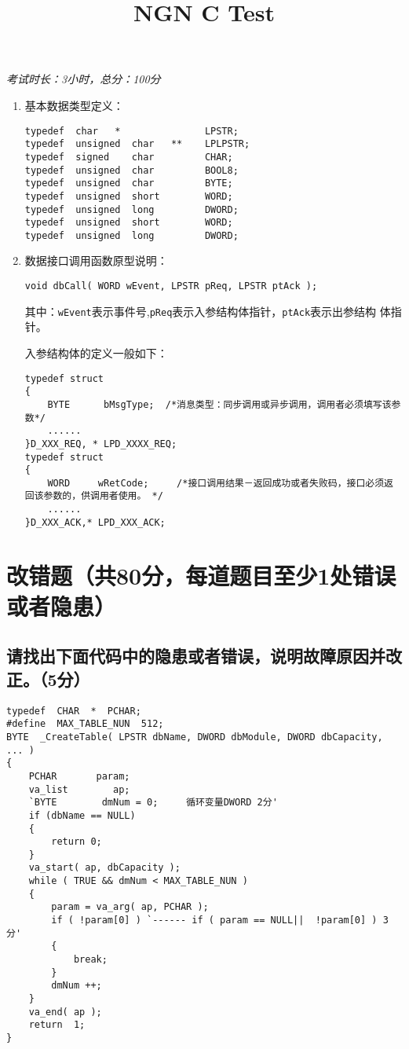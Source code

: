 ﻿\documentclass  [11pt,onecolumn,a4paper]{article}
\title{NGN C Test}
\author{}
\date{}
\begin{document}
\begin{center}
\begin{minipage}{0.8\linewidth}
\end{minipage}
\end{center}

\begin{flushright}
{\small{\textit{考试时长：3小时，总分：100分}}}
\end{flushright}

\normalsize{}

\begin{enumerate}
    \item 基本数据类型定义：
\begin{lstlisting}
typedef  char   *               LPSTR;
typedef  unsigned  char   **    LPLPSTR;
typedef  signed    char         CHAR;
typedef  unsigned  char         BOOL8;
typedef  unsigned  char         BYTE;
typedef  unsigned  short        WORD;
typedef  unsigned  long         DWORD;
typedef  unsigned  short        WORD;
typedef  unsigned  long         DWORD;
\end{lstlisting}
    \item 数据接口调用函数原型说明：
\begin{lstlisting}
void dbCall( WORD wEvent, LPSTR pReq, LPSTR ptAck );
\end{lstlisting}
其中：\lstinline{wEvent}表示事件号,\lstinline{pReq}表示入参结构体指针，\lstinline{ptAck}表示出参结构
体指针。

入参结构体的定义一般如下：
\begin{lstlisting}
typedef struct 
{
    BYTE      bMsgType;  /*消息类型：同步调用或异步调用，调用者必须填写该参数*/
    ......
}D_XXX_REQ, * LPD_XXXX_REQ;
typedef struct
{
    WORD     wRetCode;     /*接口调用结果－返回成功或者失败码，接口必须返回该参数的，供调用者使用。 */
    ......
}D_XXX_ACK,* LPD_XXX_ACK;
\end{lstlisting}
\end{enumerate}

\section{改错题（共80分，每道题目至少1处错误或者隐患）}
\subsection{请找出下面代码中的隐患或者错误，说明故障原因并改正。（5分）}
\begin{lstlisting}[escapeinside=`']
typedef  CHAR  *  PCHAR;  
#define  MAX_TABLE_NUN  512;
BYTE  _CreateTable( LPSTR dbName, DWORD dbModule, DWORD dbCapacity, ... )
{
    PCHAR       param;
    va_list        ap;
    `BYTE        dmNum = 0;     循环变量DWORD 2分'
    if (dbName == NULL)
    {
        return 0;
    }
    va_start( ap, dbCapacity );
    while ( TRUE && dmNum < MAX_TABLE_NUN )
    {
        param = va_arg( ap, PCHAR );
        if ( !param[0] ) `------ if ( param == NULL||  !param[0] ) 3分'
        {
            break;
        }
        dmNum ++;
    }
    va_end( ap ); 
    return  1;
}
\end{lstlisting}
\end{document}
